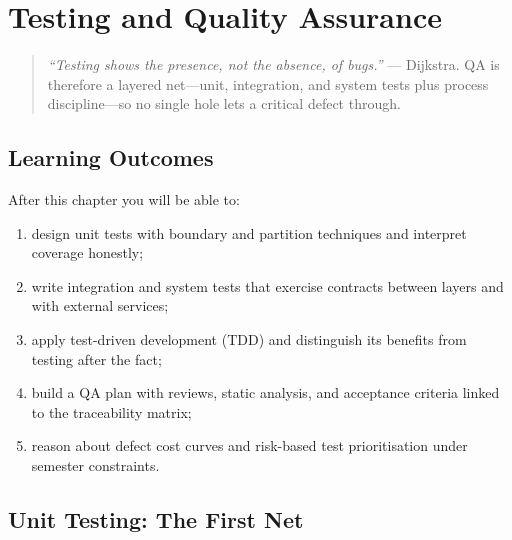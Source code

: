 \chapter{Testing and Quality Assurance}
\label{ch:testing}

\begin{quote}
\emph{``Testing shows the presence, not the absence, of bugs.''} --- Dijkstra. QA is therefore a layered net---unit, integration, and system tests plus process discipline---so no single hole lets a critical defect through.
\end{quote}

\noindent{}

\vspace{0.4em}

\section*{Learning Outcomes}
After this chapter you will be able to:
\begin{enumerate}[label=(L\arabic*)]
    \item design unit tests with boundary and partition techniques and interpret coverage honestly;
    \item write integration and system tests that exercise contracts between layers and with external services;
    \item apply test-driven development (TDD) and distinguish its benefits from testing after the fact;
    \item build a QA plan with reviews, static analysis, and acceptance criteria linked to the traceability matrix;
    \item reason about defect cost curves and risk-based test prioritisation under semester constraints.
\end{enumerate}

\section{Unit Testing: The First Net}
\label{sec:unit-testing}

